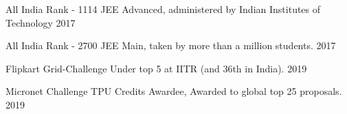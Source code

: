 
\begin{cvhonors}

  \cvhonor
    {All India Rank - 1114} %
    {JEE Advanced, administered by Indian Institutes of Technology} %
    {} %
    {2017} %

  \cvhonor
    {All India Rank - 2700} %
    {JEE Main, taken by more than a million students.} %
    {} %
    {2017} %


  \cvhonor
    {Flipkart Grid-Challenge} %
    {Under top 5 at IITR (and 36th in India).} %
    {} %
    {2019} %

  \cvhonor
    {Micronet Challenge} %
    {TPU Credits Awardee, Awarded to global top 25 proposals.} %
    {} %
    {2019} %
\end{cvhonors}
